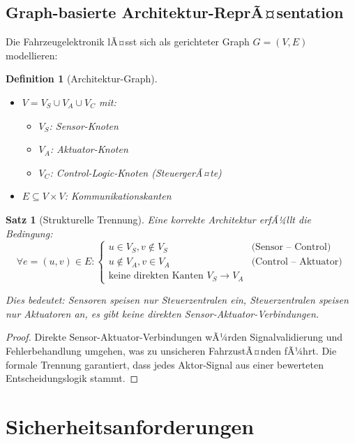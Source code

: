 ﻿\documentclass[a4paper,12pt]{article}
\newtheorem{definition}{Definition}
\newtheorem{satz}{Satz}
\begin{document}
\subsection{Graph-basierte Architektur-ReprÃ¤sentation}

Die Fahrzeugelektronik lÃ¤sst sich als gerichteter Graph $G = (V, E)$ modellieren:

\begin{definition}[Architektur-Graph]
\begin{itemize}
	\item $V = V_S \cup V_A \cup V_C$ mit:
	\begin{itemize}
		\item $V_S$: Sensor-Knoten
		\item $V_A$: Aktuator-Knoten
		\item $V_C$: Control-Logic-Knoten (SteuergerÃ¤te)
	\end{itemize}
	\item $E \subseteq V \times V$: Kommunikationskanten
\end{itemize}
\end{definition}

\begin{satz}[Strukturelle Trennung]
Eine korrekte Architektur erfÃ¼llt die Bedingung:
\[
\forall e = (u, v) \in E: 
\begin{cases}
u \in V_S, v \notin V_S & \text{(Sensor -- Control)} \\
u \notin V_A, v \in V_A & \text{(Control -- Aktuator)} \\
\text{keine direkten Kanten } V_S \to V_A &
\end{cases}
\]

Dies bedeutet: Sensoren speisen nur Steuerzentralen ein, Steuerzentralen speisen nur 
Aktuatoren an, es gibt keine direkten Sensor-Aktuator-Verbindungen.
\end{satz}

\begin{proof}
Direkte Sensor-Aktuator-Verbindungen wÃ¼rden Signalvalidierung und Fehlerbehandlung 
umgehen, was zu unsicheren FahrzustÃ¤nden fÃ¼hrt. Die formale Trennung garantiert, 
dass jedes Aktor-Signal aus einer bewerteten Entscheidungslogik stammt. 
\end{proof}

\section{Sicherheitsanforderungen}
\end{document}
